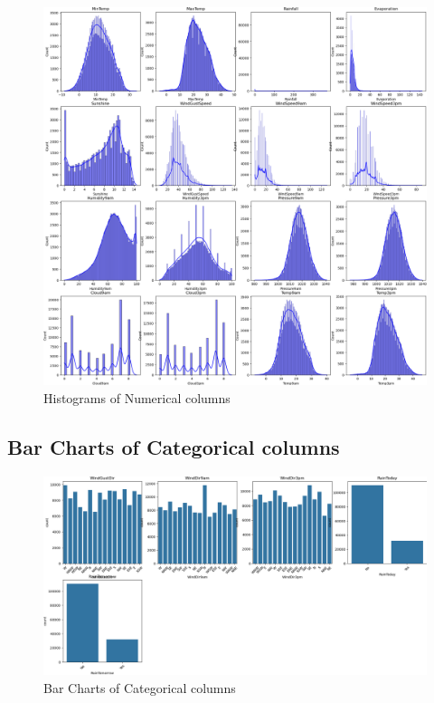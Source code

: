 \documentclass{article}%
\begin{document}
\begin{figure}[h!]%
\centering%
\includegraphics[width=460px]{EDA/histograms.png}%
\caption{Histograms of Numerical columns}%
\end{figure}

%
\newpage%
\subsection{Bar Charts of Categorical columns}%
\label{subsec:BarChartsofCategoricalcolumns}%


\begin{figure}[h!]%
\centering%
\includegraphics[width=460px]{EDA/bar_charts.png}%
\caption{Bar Charts of Categorical columns}%
\end{figure}

%
\end{document}
